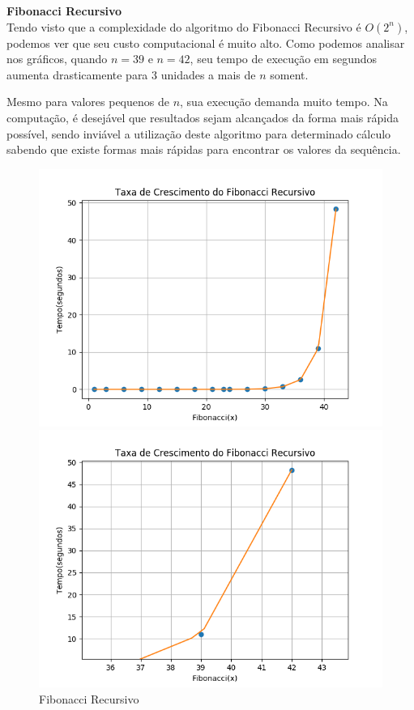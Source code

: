 \documentclass[a4paper, 12pt]{article}
\begin{document}
{\Large\bf Fibonacci Recursivo}\\

Tendo visto que a complexidade do algoritmo do Fibonacci Recursivo é $O(2^n)$, podemos ver que seu custo computacional é muito alto. Como podemos analisar nos gráficos, quando $n=39$ e $n=42$, seu tempo de execução em segundos aumenta drasticamente para 3 unidades a mais de $n$ soment.

Mesmo para valores pequenos de $n$, sua execução demanda muito tempo. Na computação, é desejável que resultados sejam alcançados da forma mais rápida possível, sendo inviável a utilização deste algoritmo para determinado cálculo sabendo que existe formas mais rápidas para encontrar os valores da sequência.

\begin{figure}[h]
\centering
\begin{minipage}[b]{0.45\linewidth}
\includegraphics[width=\linewidth]{../fibonacci_recursivo.png}
\caption{Fibonacci Recursivo}
\end{minipage}
\hfill
\begin{minipage}[b]{0.45\linewidth}
\includegraphics[width=\linewidth]{../fibonacci_recursivo_zoom.png}

\end{minipage}
\end{figure}
\end{document}
